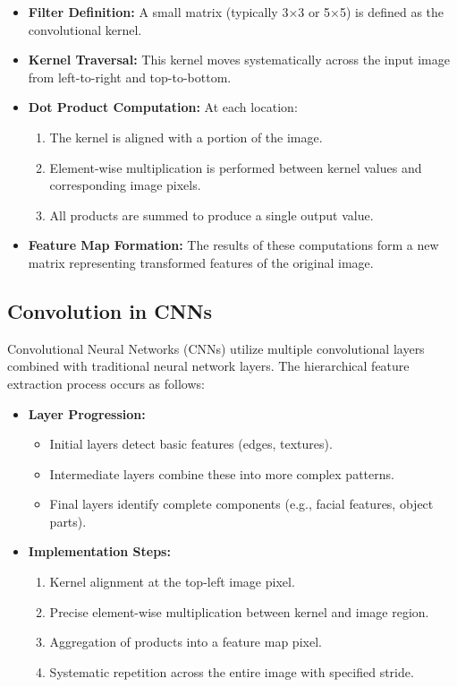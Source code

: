 \documentclass[conference, 10pt]{IEEEtran}
\begin{document}
\begin{itemize}
\begin{itemize}
\begin{itemize}
    \item \textbf{Filter Definition:} A small matrix (typically 3×3 or 5×5) is defined as the convolutional kernel.
    \item \textbf{Kernel Traversal:} This kernel moves systematically across the input image from left-to-right and top-to-bottom.
    \item \textbf{Dot Product Computation:} At each location:
    \begin{enumerate}
        \item The kernel is aligned with a portion of the image.
        \item Element-wise multiplication is performed between kernel values and corresponding image pixels.
        \item All products are summed to produce a single output value.
    \end{enumerate}
    \item \textbf{Feature Map Formation:} The results of these computations form a new matrix representing transformed features of the original image.
\end{itemize}

\subsection{Convolution in CNNs}
Convolutional Neural Networks (CNNs) utilize multiple convolutional layers combined with traditional neural network layers. The hierarchical feature extraction process occurs as follows:

\begin{itemize}
    \item \textbf{Layer Progression:}
    \begin{itemize}
        \item Initial layers detect basic features (edges, textures).
        \item Intermediate layers combine these into more complex patterns.
        \item Final layers identify complete components (e.g., facial features, object parts).
    \end{itemize}
    \item \textbf{Implementation Steps:}
    \begin{enumerate}
        \item Kernel alignment at the top-left image pixel.
        \item Precise element-wise multiplication between kernel and image region.
        \item Aggregation of products into a feature map pixel.
        \item Systematic repetition across the entire image with specified stride.
    \end{enumerate}
\end{itemize}


\end{itemize}
\end{itemize}
\end{document}
